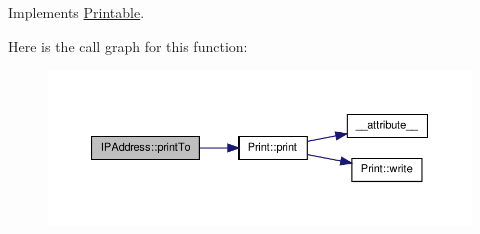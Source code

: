 Implements \hyperlink{class_printable_a2c5776bc55c0a3a5675bba9d4d8e3681}{Printable}.



Here is the call graph for this function\-:
\nopagebreak
\begin{figure}[H]
\begin{center}
\leavevmode
\includegraphics[width=350pt]{class_i_p_address_a2dd7f6c455c2f33e4639944f751930db_cgraph}
\end{center}
\end{figure}




